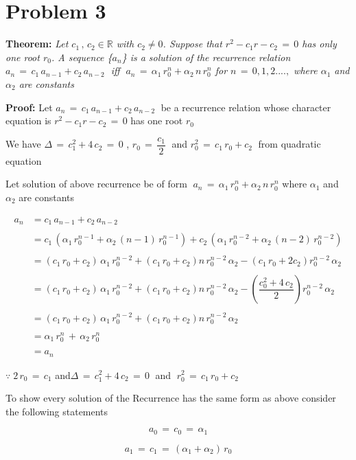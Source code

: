 \documentclass{article}
\begin{document}
\section*{Problem 3}
\textbf{Theorem:} \textit{Let $c_1\,,\,c_2 \in \mathbb{R}$ with $c_2 \neq 0$. Suppose
that $r^2-c_1r-c_2\,=\,0$ has only one root $r_0$. A sequence \{$a_n$\} is a solution of the
recurrence relation $a_n\,=\,c_1\,a_{n-1} + c_2\,a_{n-2}\;$  iff    
$\;a_n\,=\,\alpha_{1}\,r_{0}^{n} + \alpha_{2}\,n\,r_{0}^{n}$ for $n\,=\,0,1,2....,$ where
$\alpha_1$ and $\alpha_2$ are constants}
\null \par \null
\noindent \textbf{Proof:} Let $a_n\,=\,c_1\,a_{n-1} + c_2\,a_{n-2}\;$ be a
recurrence relation whose character equation is $r^2-c_1r-c_2\,=\,0$ has one root $r_0$
\null \par \null
\noindent We have $\Delta\,=\,c_{1}^{2}+4\,c_2\,=\,0$ , $r_0\,=\,\dfrac{c_1}{2}\;$ 
and $r_{0}^{2}\,=\,c_1\,r_0 + c_2\;$ from quadratic equation
\null \par \null
\noindent Let solution of above recurrence be of form 
$\;a_n\,=\,\alpha_{1}\,r_{0}^{n} + \alpha_{2}\,n\,r_{0}^{n}$ 
where $\alpha_1$ and $\alpha_2$ are constants

\begin{align*}
a_n &= c_1\,a_{n-1}+c_2\,a_{n-2} \\ \\
    &= c_1\,(\alpha_{1}\,r_{0}^{n-1} + \alpha_{2}\,(n-1)\,r_{0}^{n-1})
    +c_2\,(\alpha_{1}\,r_{0}^{n-2} + \alpha_{2}\,(n-2)\,r_{0}^{n-2}) 
\\ \\
    &= (c_1\,r_0+c_2)\,\alpha_1\,r_{0}^{n-2} + (c_1\,r_0+c_2)n\,r_{0}^{n-2}\,\alpha_2 -
    (c_1\,r_0+2c_2)r_{0}^{n-2}\,\alpha_2
\\ \\
    &= (c_1\,r_0+c_2)\,\alpha_1\,r_{0}^{n-2} + (c_1\,r_0+c_2)n\,r_{0}^{n-2}\,\alpha_2 -
    \left(\dfrac{c_{0}^{2}+4\,c_2}{2}\right)r_{0}^{n-2}\,\alpha_2 
\\ \\
    &= (c_1\,r_0+c_2)\,\alpha_1\,r_{0}^{n-2} + (c_1\,r_0+c_2)n\,r_{0}^{n-2}\,\alpha_2 
\\ \\
    &= \alpha_1\,r_{0}^{n}\,+\,\alpha_2\,r_{0}^{n}
\\ \\
    &= a_n
\end{align*}

$\because\;2\,r_0\,=\,c_1$ and\;$\Delta\,=\,c_{1}^{2}+4\,c_2\,=\,0\;$ and 
$\;r_{0}^{2}\,=\,c_1\,r_0 + c_2\;$ 
\null \par \null
\noindent To show every solution of the Recurrence has the same form as above consider the 
following statements 
\null \par \null
$$a_0\,=\,c_0\,=\,\alpha_1$$
\null \par
$$a_1\,=\,c_1\,=\,(\alpha_1+\alpha_2)\,r_0$$
\end{document}
